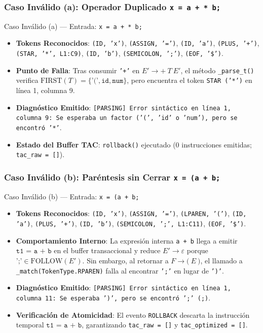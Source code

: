 \documentclass[11pt, letterpaper]{article}
\begin{document}
\subsubsection{Caso Inválido (a): Operador Duplicado \texttt{x = a + * b;}}
\begin{errbox}{Caso Inválido (a) --- Entrada: \texttt{x = a + * b;}}
\begin{itemize}[leftmargin=1.5em, itemsep=2pt]
    \item \textbf{Tokens Reconocidos}: \texttt{(ID, 'x')}, \texttt{(ASSIGN, '=')}, \texttt{(ID, 'a')}, \texttt{(PLUS, '+')}, \texttt{(STAR, '*', L1:C9)}, \texttt{(ID, 'b')}, \texttt{(SEMICOLON, ';')}, \texttt{(EOF, '\$')}.
    \item \textbf{Punto de Falla}: Tras consumir \texttt{'+'} en $E' \rightarrow \textbf{+}\ T\ E'$, el método \texttt{\_parse\_t()} verifica $\text{FIRST}(T) = \{\texttt{'('}, \texttt{id}, \texttt{num}\}$, pero encuentra el token \texttt{STAR ('*')} en línea 1, columna 9.
    \item \textbf{Diagnóstico Emitido}: \texttt{[PARSING] Error sintáctico en línea 1, columna 9: Se esperaba un factor ('(', 'id' o 'num'), pero se encontró '*'}.
    \item \textbf{Estado del Buffer TAC}: \texttt{rollback()} ejecutado (0 instrucciones emitidas; \texttt{tac\_raw = []}).
\end{itemize}
\end{errbox}

\subsubsection{Caso Inválido (b): Paréntesis sin Cerrar \texttt{x = (a + b;}}
\begin{errbox}{Caso Inválido (b) --- Entrada: \texttt{x = (a + b;}}
\begin{itemize}[leftmargin=1.5em, itemsep=2pt]
    \item \textbf{Tokens Reconocidos}: \texttt{(ID, 'x')}, \texttt{(ASSIGN, '=')}, \texttt{(LPAREN, '(')}, \texttt{(ID, 'a')}, \texttt{(PLUS, '+')}, \texttt{(ID, 'b')}, \texttt{(SEMICOLON, ';', L1:C11)}, \texttt{(EOF, '\$')}.
    \item \textbf{Comportamiento Interno}: La expresión interna \texttt{a + b} llega a emitir $\texttt{t1 = a + b}$ en el buffer transaccional y reduce $E' \rightarrow \varepsilon$ porque $\texttt{';'} \in \text{FOLLOW}(E')$. Sin embargo, al retornar a $F \rightarrow \textbf{(}\ E\ \textbf{)}$, el llamado a \texttt{\_match(TokenType.RPAREN)} falla al encontrar \texttt{';'} en lugar de \texttt{')'}.
    \item \textbf{Diagnóstico Emitido}: \texttt{[PARSING] Error sintáctico en línea 1, columna 11: Se esperaba ')', pero se encontró ';' (;)}.
    \item \textbf{Verificación de Atomicidad}: El evento \texttt{ROLLBACK} descarta la instrucción temporal $\texttt{t1 = a + b}$, garantizando \texttt{tac\_raw = []} y \texttt{tac\_optimized = []}.
\end{itemize}
\end{errbox}
\end{document}
